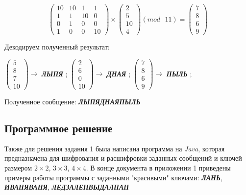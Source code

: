 \documentclass[a5paper, 10pt]{article}
\theoremstyle{definition}
\theoremstyle{plain}
\theoremstyle{remark}
\begin{document}
\begin{equation}
\begin{pmatrix}
10 & 10 & 1 & 1\\
1 & 1 & 10 & 0 \\
0 & 1 & 0 & 0 \\
1 & 0 & 0 & 10
\end{pmatrix}
 \times
\begin{pmatrix}
2\\
5\\
10\\
4
\end{pmatrix}
(mod \text{ }11)
= \begin{pmatrix}
7\\
8\\
6\\
9
\end{pmatrix}
\end{equation}

Декодируем полученный результат:
\begin{center}
 $ \begin{pmatrix}
5\\
8\\
7\\
10
\end{pmatrix} \to$ \textbf{\textit{ЛЫПЯ}} ;
 $ \begin{pmatrix}
2\\
6\\
0\\
10
\end{pmatrix} \to$ \textbf{\textit{ДНАЯ}} ;
 $ \begin{pmatrix}
7\\
8\\
6\\
9
\end{pmatrix} \to$ \textbf{\textit{ПЫЛЬ}} ;
\end{center}
Полученное сообщение:  \textbf{\textit{\colorbox{red! 50}{ЛЫПЯ}\colorbox{green! 50}{ДНАЯПЫЛЬ}}}\\

\subsection{Программное решение}
Также для решения задания 1 была написана программа на \textit{Java}, которая предназначена для шифрования и расшифровки заданных сообщений и ключей размером $2 \times 2$,  $3 \times 3$, $4 \times 4$. 
В конце документа в приложении 1 приведены примеры работы программы с заданными "красивыми" ключами:  \textbf{\textit{ЛАНЬ}},  \textbf{\textit{ИВАНЯВАНЯ}},  \textbf{\textit{ЛЕДЗАЛЕНВЫДАЛПАН}}
\end{document}
